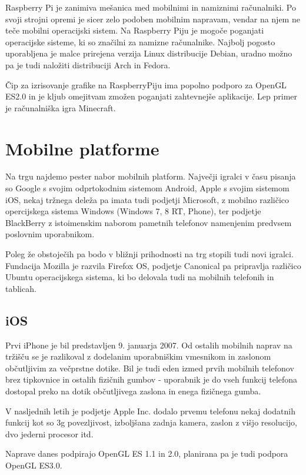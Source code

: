 Raspberry Pi je zanimiva mešanica med mobilnimi in namiznimi računalniki. Po svoji strojni opremi je sicer zelo podoben mobilnim napravam, vendar na njem ne teče mobilni operacijski sistem. Na Raspberry Piju je mogoče poganjati operacijske sisteme, ki so značilni za namizne računalnike. Najbolj pogosto uporabljena je malce prirejena verzija Linux distribucije Debian, uradno možno pa je tudi naložiti distribuciji Arch in Fedora.

Čip za izrisovanje grafike na RaspberryPiju ima popolno podporo za OpenGL ES2.0 in je kljub omejitvam zmožen poganjati zahtevnejše aplikacije. Lep primer je računalniška igra Minecraft.

\section{Mobilne platforme} 

Na trgu najdemo pester nabor mobilnih platform. Največji igralci v času pisanja so Google s svojim odprtokodnim sistemom Android, Apple s svojim sistemom iOS, nekaj tržnega deleža pa imata tudi podjetji Microsoft, z mobilno različico opercijskega sistema Windows (Windows 7, 8 RT, Phone), ter podjetje BlackBerry z istoimenskim naborom pametnih telefonov namenjenim predvsem poslovnim uporabnikom.

Poleg že obstoječih pa bodo v bližnji prihodnosti na trg stopili tudi novi igralci. Fundacija Mozilla je razvila Firefox OS, podjetje Canonical pa pripravlja različico Ubuntu operacijskega sistema, ki bo delovala tudi na mobilnih telefonih in tablicah.

\subsection{iOS}

Prvi iPhone je bil predstavljen 9. januarja 2007. Od ostalih mobilnih naprav na tržišču se je razlikoval z dodelanim uporabniškim vmesnikom in zaslonom občutljivim za večprstne dotike. Bil je tudi eden izmed prvih mobilnih telefonov brez tipkovnice in ostalih fizičnih gumbov - uporabnik je do vseh funkcij telefona dostopal preko na dotik občutljivega zaslona in enega fizičnega gumba.

V nasljednih letih je podjetje Apple Inc. dodalo prvemu telefonu nekaj dodatnih funkcij kot so 3g povezljivost, izboljšana zadnja kamera, zaslon z višjo resolucijo, dvo jederni procesor itd.

Naprave danes podpirajo OpenGL ES 1.1 in 2.0, planirana pa je tudi podpora OpenGL ES3.0. 

